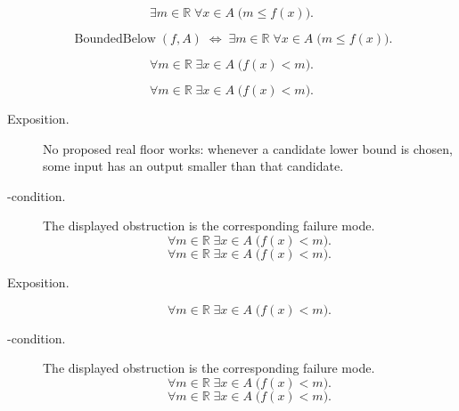 \begin{remark*}
\[
  \exists m\in\mathbb{R}\;\forall x\in A\;\bigl(m\leq f(x)\bigr).
\]
\end{remark*}

\begin{remark*}
\[
  \operatorname{BoundedBelow}(f,A)
  \;\Longleftrightarrow\;
  \exists m\in\mathbb{R}\;\forall x\in A\;\bigl(m\leq f(x)\bigr).
\]
\end{remark*}

\begin{remark*}
\[
  \forall m\in\mathbb{R}\;\exists x\in A\;\bigl(f(x)<m\bigr).
\]
\end{remark*}

\begin{remark*}
\[
  \forall m\in\mathbb{R}\;\exists x\in A\;\bigl(f(x)<m\bigr).
\]
\end{remark*}



\begin{remark*}
\begin{description}
  \item[Exposition.]
No proposed real floor works: whenever a candidate lower bound is chosen,
some input has an output smaller than that candidate.


  \item[\exists-condition.]
  The displayed obstruction is the corresponding failure mode.
  \[
  \forall m\in\mathbb{R}\;\exists x\in A\;\bigl(f(x)<m\bigr).
\]
  \[
  \forall m\in\mathbb{R}\;\exists x\in A\;\bigl(f(x)<m\bigr).
\]
\end{description}
\end{remark*}

\begin{remark*}
\begin{description}
  \item[Exposition.]
\[
  \forall m\in\mathbb{R}\;\exists x\in A\;\bigl(f(x)<m\bigr).
\]


  \item[\exists-condition.]
  The displayed obstruction is the corresponding failure mode.
  \[
  \forall m\in\mathbb{R}\;\exists x\in A\;\bigl(f(x)<m\bigr).
\]
  \[
  \forall m\in\mathbb{R}\;\exists x\in A\;\bigl(f(x)<m\bigr).
\]
\end{description}
\end{remark*}

